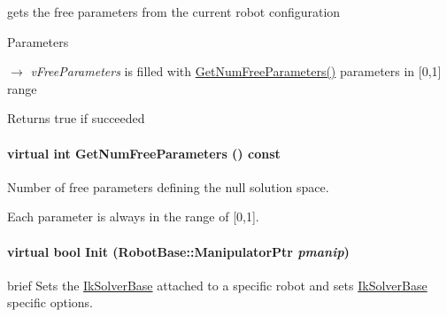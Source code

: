 gets the free parameters from the current robot configuration 


\begin{DoxyParams}{Parameters}
\item[\mbox{$\rightarrow$} {\em vFreeParameters}]is filled with \hyperlink{classOpenRAVE_1_1IkSolverBase_a1d5067536e60e18e86fb94429e4d289f}{GetNumFreeParameters()} parameters in \mbox{[}0,1\mbox{]} range \end{DoxyParams}
\begin{DoxyReturn}{Returns}
true if succeeded 
\end{DoxyReturn}
\hypertarget{classOpenRAVE_1_1IkSolverBase_a1d5067536e60e18e86fb94429e4d289f}{
\paragraph[{GetNumFreeParameters}]{\setlength{\rightskip}{0pt plus 5cm}virtual int GetNumFreeParameters () const}\hfill}
\label{classOpenRAVE_1_1IkSolverBase_a1d5067536e60e18e86fb94429e4d289f}


Number of free parameters defining the null solution space. 

Each parameter is always in the range of \mbox{[}0,1\mbox{]}. \hypertarget{classOpenRAVE_1_1IkSolverBase_afdba95c2515eb1d2a7d375c24f8dcb41}{
\paragraph[{Init}]{\setlength{\rightskip}{0pt plus 5cm}virtual bool Init (RobotBase::ManipulatorPtr {\em pmanip})}\hfill}
\label{classOpenRAVE_1_1IkSolverBase_afdba95c2515eb1d2a7d375c24f8dcb41}
brief Sets the \hyperlink{classOpenRAVE_1_1IkSolverBase}{IkSolverBase} attached to a specific robot and sets \hyperlink{classOpenRAVE_1_1IkSolverBase}{IkSolverBase} specific options.


